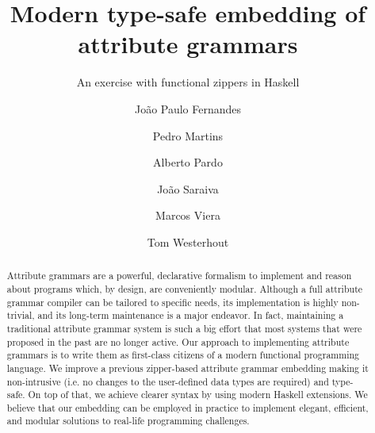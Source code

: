\documentclass[runningheads]{llncs}
\begin{document}
\title{Modern type-safe embedding of attribute grammars}
\subtitle{An exercise with functional zippers in Haskell}


\author{Jo{\~a}o Paulo Fernandes%
   \and Pedro Martins%
   \and Alberto Pardo%
   \and Jo{\~a}o Saraiva%
   \and Marcos Viera%
   \and Tom Westerhout%
}

\date{}

\maketitle

\begin{abstract}
  Attribute grammars are a powerful, declarative formalism to implement and
  reason about programs which, by design, are conveniently modular. Although a
  full attribute grammar compiler can be tailored to specific needs, its
  implementation is highly non-trivial, and its long-term maintenance is a major
  endeavor. In fact, maintaining a traditional attribute grammar system is such
  a big effort that most systems that were proposed in the past are no longer
  active. Our approach to implementing attribute grammars is to write them as
  first-class citizens of a modern functional programming language. We improve a
  previous zipper-based attribute grammar embedding making it non-intrusive
  (i.e. no changes to the user-defined data types are required) and type-safe.
  On top of that, we achieve clearer syntax by using modern Haskell extensions.
  We believe that our embedding can be employed in practice to implement
  elegant, efficient, and modular solutions to real-life programming challenges.

\end{abstract}
\end{document}
